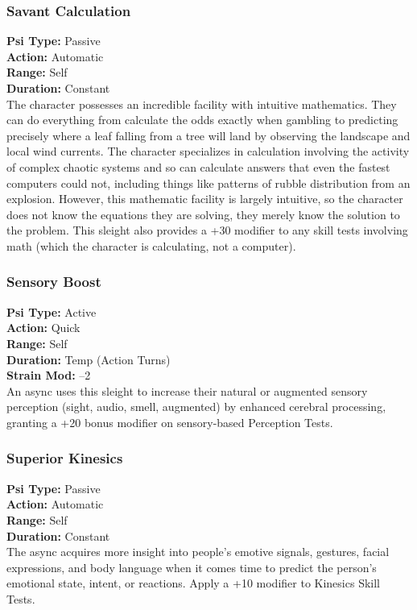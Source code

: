 \subsubsection{Savant Calculation} \textbf{Psi Type:} Passive \\ \textbf{Action:} Automatic \\ \textbf{Range:} Self \\ \textbf{Duration:} Constant \\ The character possesses an incredible facility with intuitive mathematics. They can do everything from calculate the odds exactly when gambling to predicting precisely where a leaf falling from a tree will land by observing the landscape and local wind currents. The character specializes in calculation involving the activity of complex chaotic systems and so can calculate answers that even the fastest computers could not, including things like patterns of rubble distribution from an explosion. However, this mathematic facility is largely intuitive, so the character does not know the equations they are solving, they merely know the solution to the problem. This sleight also provides a +30 modifier to any skill tests involving math (which the character is calculating, not a computer). 

\subsubsection{Sensory Boost} \textbf{Psi Type:} Active \\ \textbf{Action:} Quick \\ \textbf{Range:} Self \\ \textbf{Duration:} Temp (Action Turns) \\ \textbf{Strain Mod:} –2 \\ An async uses this sleight to increase their natural or augmented sensory perception (sight, audio, smell, augmented) by enhanced cerebral processing, granting a +20 bonus modifier on sensory-based Perception Tests. 

\subsubsection{Superior Kinesics} \textbf{Psi Type:} Passive \\ \textbf{Action:} Automatic \\ \textbf{Range:} Self \\ \textbf{Duration:} Constant \\ The async acquires more insight into people’s emotive signals, gestures, facial expressions, and body language when it comes time to predict the person’s emotional state, intent, or reactions. Apply a +10 modifier to Kinesics Skill Tests. 

